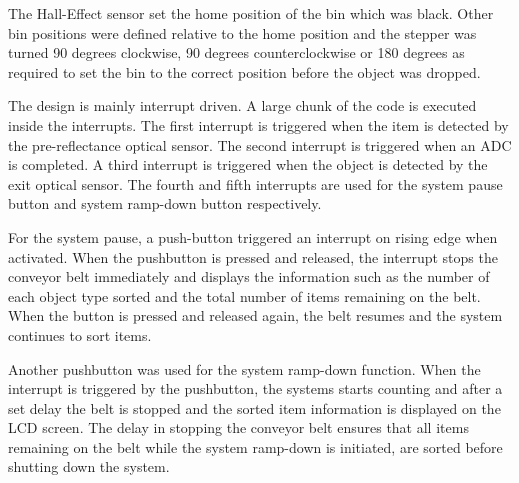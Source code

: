 The Hall-Effect sensor set the home position of the bin which was black. Other bin positions were defined relative to the home position and the stepper was turned 90 degrees clockwise, 90 degrees counterclockwise or 180 degrees as required to set the bin to the correct position before the object was dropped.

The design is mainly interrupt driven. A large chunk of the code is executed inside the interrupts. The first interrupt is triggered when the item is detected by the pre-reflectance optical sensor. The second interrupt is triggered when an ADC is completed.  A third interrupt is triggered when the object is detected by the exit optical sensor. The fourth and fifth interrupts are used for the system pause button and system ramp-down button respectively.

For the system pause, a push-button triggered an interrupt on rising edge when activated. When the pushbutton is pressed and released, the interrupt stops the conveyor belt immediately and displays the information such as the number of each object type sorted and the total number of items remaining on the belt. When the button is pressed and released again, the belt resumes and the system continues to sort items.

Another pushbutton was used for the system ramp-down function. When the interrupt is triggered by the pushbutton, the systems starts counting and after a set delay the belt is stopped and the sorted item information is displayed on the LCD screen. The delay in stopping the conveyor belt ensures that all items remaining on the belt while the system ramp-down is initiated, are sorted before shutting down the system.
